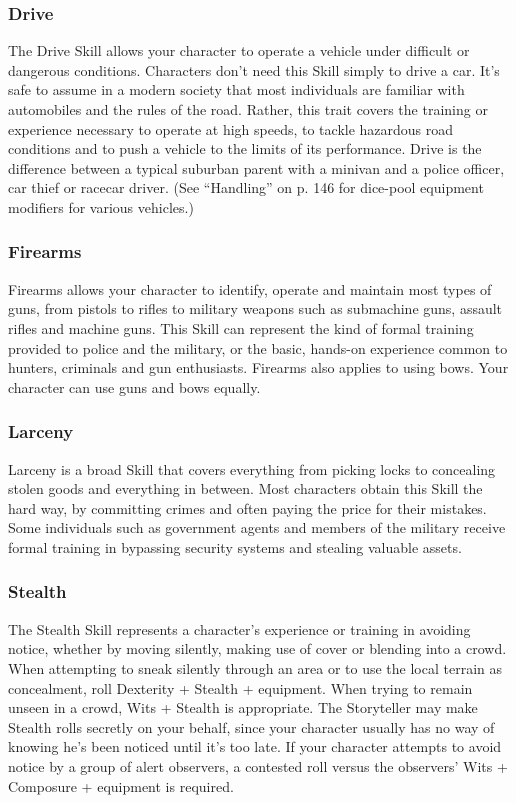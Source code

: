 \documentclass["../Misguided by Starlight.tex"]{subfiles}
\begin{document}
\subsubsection{Drive}
The Drive Skill allows your character to operate a vehicle under difficult or dangerous conditions. Characters don’t need this Skill simply to drive a car. It’s safe to assume in a modern society that most individuals are familiar with automobiles and the rules of the road. Rather, this trait covers the training or experience necessary to operate at high speeds, to tackle hazardous road conditions and to push a vehicle to the limits of its performance. Drive is the difference between a typical suburban parent with a minivan and a police officer, car thief or racecar driver. (See “Handling” on p. 146 for dice-pool equipment modifiers for various vehicles.)

\subsubsection{Firearms}
Firearms allows your character to identify, operate and maintain most types of guns, from pistols to rifles to military weapons such as submachine guns, assault rifles and machine guns. This Skill can represent the kind of formal training provided to police and the military, or the basic, hands-on experience common to hunters, criminals and gun enthusiasts. Firearms also applies to using bows. Your character can use guns and bows equally.

\subsubsection{Larceny}
Larceny is a broad Skill that covers everything from picking locks to concealing stolen goods and everything in between. Most characters obtain this Skill the hard way, by committing crimes and often paying the price for their mistakes. Some individuals such as government agents and members of the military receive formal training in bypassing security systems and stealing valuable assets.

\subsubsection{Stealth}
The Stealth Skill represents a character’s experience or training in avoiding notice, whether by moving silently, making use of cover or blending into a crowd. When attempting to sneak silently through an area or to use the local terrain as concealment, roll Dexterity + Stealth + equipment. When trying to remain unseen in a crowd, Wits + Stealth is appropriate. The Storyteller may make Stealth rolls secretly on your behalf, since your character usually has no way of knowing he’s been noticed until it’s too late. If your character attempts to avoid notice by a group of alert observers, a contested roll versus the observers’ Wits + Composure + equipment is required.
\end{document}
